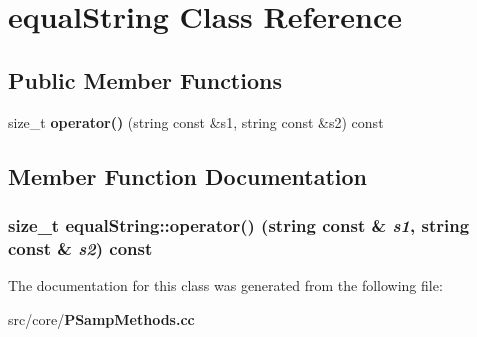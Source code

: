 \section{equal\-String Class Reference}
\label{classequalString}
\subsection*{Public Member Functions}
\begin{CompactItemize}
\item 
size\_\-t {\bf operator()} (string const \&s1, string const \&s2) const
\end{CompactItemize}


\subsection{Member Function Documentation}
\subsubsection{\setlength{\rightskip}{0pt plus 5cm}size\_\-t equal\-String::operator() (string const \& {\em s1}, string const \& {\em s2}) const\hspace{0.3cm}{\tt  [inline]}}\label{classequalString_7815ae24cd12e8622f8303520916e145}




The documentation for this class was generated from the following file:\begin{CompactItemize}
\item 
src/core/{\bf PSamp\-Methods.cc}\end{CompactItemize}
